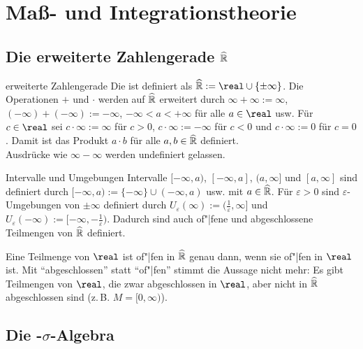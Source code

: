 \chapter{%
    Maß- und Integrationstheorie%
}

\section{%
    Die erweiterte Zahlengerade\texorpdfstring{ $\widehat{\mathbb{R}}$}{}%
}

\begin{Def}{erweiterte Zahlengerade}
    Die  ist definiert als
    $\extreal := \real \cup \{\pm \infty\}$.
    Die Operationen $+$ und $\cdot$ werden auf $\widehat{\mathbb{R}}$ erweitert durch
    $\infty + \infty := \infty$, $(-\infty) + (-\infty) := -\infty$,
    $-\infty < a < +\infty$ für alle $a \in \real$ usw.
    Für $c \in \real$ sei $c \cdot \infty := \infty$ für $c > 0$,
    $c \cdot \infty := -\infty$ für $c < 0$ und $c \cdot \infty := 0$ für $c = 0$.
    Damit ist das Produkt $a \cdot b$ für alle $a, b \in \widehat{\mathbb{R}}$ definiert.\\
    Ausdrücke wie $\infty - \infty$ werden undefiniert gelassen.
\end{Def}

\begin{Def}{Intervalle und Umgebungen}
    Intervalle $[-\infty, a)$, $[-\infty, a]$, $(a, \infty]$ und $[a, \infty]$ sind definiert
    durch $[-\infty, a) := \{-\infty\} \cup (-\infty, a)$ usw. mit $a \in \widehat{\mathbb{R}}$.
    Für $\varepsilon > 0$ sind $\varepsilon$-Umgebungen von $\pm \infty$ definiert durch
    $U_\varepsilon(\infty) := (\frac{1}{\varepsilon}, \infty]$ und
    $U_\varepsilon(-\infty) := [-\infty, -\frac{1}{\varepsilon})$.
    Dadurch sind auch of"|fene und abgeschlossene Teilmengen von $\widehat{\mathbb{R}}$ definiert.
\end{Def}

\begin{Bem}
    Eine Teilmenge von $\real$ ist of"|fen in $\widehat{\mathbb{R}}$ genau dann,
    wenn sie of"|fen in $\real$ ist.
    Mit "`abgeschlossen"' statt "`of"|fen"' stimmt die Aussage nicht mehr:
    Es gibt Teilmengen von $\real$, die zwar abgeschlossen in $\real$, aber nicht in $\widehat{\mathbb{R}}$
    abgeschlossen sind (z.\,B. $M = [0, \infty)$).
\end{Bem}

\section{%
    Die -\texorpdfstring{$\sigma$}{σ}-Algebra%
}

